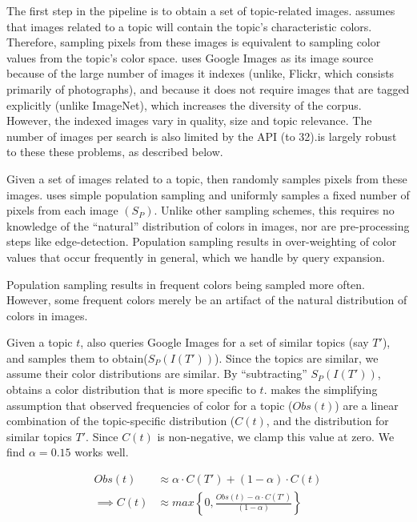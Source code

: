 
The first step in the \system pipeline is to obtain a set of topic-related images. \system assumes that images related to a topic will contain the topic's characteristic colors. Therefore, sampling pixels from these images is equivalent to sampling color values from the topic's color space. \system uses Google Images as its image source because of the large number of images it indexes (unlike, Flickr, which consists primarily of photographs), and because it does not require images that are tagged explicitly (unlike ImageNet), which increases the diversity of the corpus. However, the indexed images vary in quality, size and topic relevance. The number of images per search is also limited by the API (to 32).\system is largely robust to these these problems, as described below. 

Given a set of images related to a topic, \system then randomly samples pixels from these images. \system uses simple population sampling and uniformly samples a fixed number of pixels from each image $(S_{P})$. Unlike other sampling schemes, this requires no knowledge of the ``natural'' distribution of colors in images, nor are pre-processing steps like edge-detection. Population sampling results in over-weighting of color values that occur frequently in general, which we handle by query expansion.

Population sampling results in frequent colors being sampled more often. However, some frequent colors merely be an artifact of the natural distribution of colors in images. 

Given a topic $t$, \system also queries Google Images for a set of similar topics (say $T'$), and samples them to obtain($S_{P}(I(T'))$). Since the topics are similar, we assume their color distributions are similar. By ``subtracting'' $S_{P}(I(T'))$, \system obtains a color distribution that is more specific to $t$. \system makes the simplifying assumption that observed frequencies of color for a topic ($Obs(t)$) are a linear combination of the topic-specific distribution ($C(t)$, and the distribution for similar topics $T'$. Since $C(t)$ is non-negative, we clamp this value at zero. We find $\alpha = 0.15$ works well.

\begin{align}
Obs(t) &\approx \alpha\cdot C(T') + (1-\alpha)\cdot C(t) \\
\label{linear-color}
\implies  C(t) &\approx max\left\{0,\frac{Obs(t) - \alpha\cdot C(T')}{(1-\alpha)}\right\}
\end{align}

